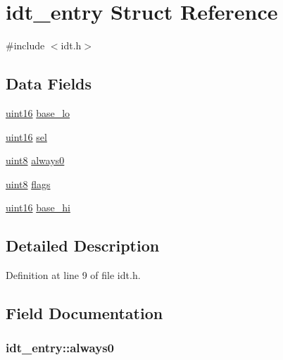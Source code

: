 \hypertarget{structidt__entry}{
\section{idt\_\-entry Struct Reference}
\label{structidt__entry}
}


{\ttfamily \#include $<$idt.h$>$}

\subsection*{Data Fields}
\begin{DoxyCompactItemize}
\item 
\hyperlink{int__types_8h_a05f6b0ae8f6a6e135b0e290c25fe0e4e}{uint16} \hyperlink{structidt__entry_ad5d8ba8d3e252910fda030bfd3a0a4fa}{base\_\-lo}
\item 
\hyperlink{int__types_8h_a05f6b0ae8f6a6e135b0e290c25fe0e4e}{uint16} \hyperlink{structidt__entry_a553cf62213ff6685d8344eedb1ea6fd7}{sel}
\item 
\hyperlink{int__types_8h_adde6aaee8457bee49c2a92621fe22b79}{uint8} \hyperlink{structidt__entry_a53a8b0e61df3e4c3bd932b1538c13bcb}{always0}
\item 
\hyperlink{int__types_8h_adde6aaee8457bee49c2a92621fe22b79}{uint8} \hyperlink{structidt__entry_a630f3c16426126a6040aeb98f7802000}{flags}
\item 
\hyperlink{int__types_8h_a05f6b0ae8f6a6e135b0e290c25fe0e4e}{uint16} \hyperlink{structidt__entry_ad4836498023a53a3eb32cd278a30f27d}{base\_\-hi}
\end{DoxyCompactItemize}


\subsection{Detailed Description}


Definition at line 9 of file idt.h.



\subsection{Field Documentation}
\hypertarget{structidt__entry_a53a8b0e61df3e4c3bd932b1538c13bcb}{
\subsubsection[{always0}]{ {\bf idt\_\-entry::always0}}}
\label{structidt__entry_a53a8b0e61df3e4c3bd932b1538c13bcb}



